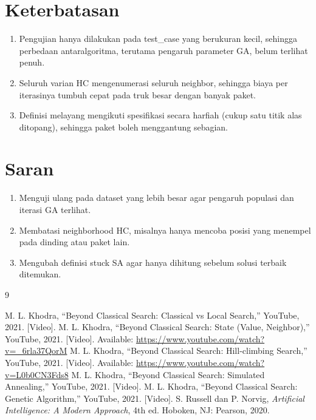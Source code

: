 \documentclass[12pt,a4paper]{report}
\begin{document}
\section{Keterbatasan}
\begin{enumerate}[leftmargin=1.5cm]
  \item Pengujian hanya dilakukan pada test\_case yang berukuran kecil, sehingga perbedaan antaralgoritma, terutama pengaruh parameter GA, belum terlihat penuh.
  \item Seluruh varian HC mengenumerasi seluruh neighbor, sehingga biaya per iterasinya tumbuh cepat pada truk besar dengan banyak paket.
  \item Definisi melayang mengikuti spesifikasi secara harfiah (cukup satu titik alas ditopang), sehingga paket boleh menggantung sebagian.
\end{enumerate}

\section{Saran}
\begin{enumerate}[leftmargin=1.5cm]
  \item Menguji ulang pada dataset yang lebih besar agar pengaruh populasi dan iterasi GA terlihat.
  \item Membatasi neighborhood HC, misalnya hanya mencoba posisi yang menempel pada dinding atau paket lain.
  \item Mengubah definisi stuck SA agar hanya dihitung sebelum solusi terbaik ditemukan.
\end{enumerate}

\begin{thebibliography}{9}
 M. L. Khodra, ``Beyond Classical Search: Classical vs Local Search,'' YouTube, 2021. [Video].
 M. L. Khodra, ``Beyond Classical Search: State (Value, Neighbor),'' YouTube, 2021. [Video]. Available: \url{https://www.youtube.com/watch?v=_6rla37QorM}
 M. L. Khodra, ``Beyond Classical Search: Hill-climbing Search,'' YouTube, 2021. [Video]. Available: \url{https://www.youtube.com/watch?v=L0b0CN3Fds8}
 M. L. Khodra, ``Beyond Classical Search: Simulated Annealing,'' YouTube, 2021. [Video].
 M. L. Khodra, ``Beyond Classical Search: Genetic Algorithm,'' YouTube, 2021. [Video].
 S. Russell dan P. Norvig, \textit{Artificial Intelligence: A Modern Approach}, 4th ed. Hoboken, NJ: Pearson, 2020.
\end{thebibliography}
\end{document}

